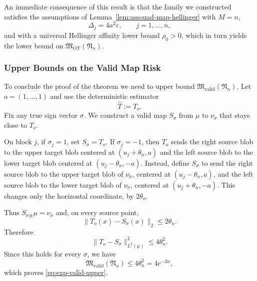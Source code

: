 \documentclass[11pt,twoside]{article}
\newcommand{\targetclass}{\mathfrak{N}}
\newcommand{\validminimaxrisk}{\mathfrak{M}_{\text{valid}}}
\newcommand{\otminimaxrisk}{\mathfrak{M}_{\text{OT}}}
\begin{document}
An immediate consequence of this result is that 
the family we constructed satisfies the assumptions of
Lemma~\ref{lem:assouad-map-hellinger} with $M=n$,
\[
\Delta_j=4a^2\varepsilon,
\qquad j=1,\ldots,n,
\]
and with a universal Hellinger affinity lower bound $\rho_0>0$, which in turn yields the lower bound on $\otminimaxrisk(\targetclass_n)$.

\subsubsection{Upper Bounds on the Valid Map Risk}
To conclude the proof of the theorem we need to upper bound $\validminimaxrisk(\targetclass_n)$.
Let $o = (1,\ldots,1)$ and use the deterministic estimator
\[
\widehat T:=T_o.
\]
Fix any true sign vector $\sigma$. We construct a valid map $S_\sigma$
from $\mu$ to $\nu_\sigma$ that stays close to $T_o$.

On block $j$, if $\sigma_j=1$, set $S_\sigma=T_o$. If
$\sigma_j=-1$, then $T_o$ sends the right source blob to the
upper target blob centered at $(u_j+\theta_n,a)$ and the left source blob
to the lower target blob centered at $(u_j-\theta_n,-a)$. Instead, define
$S_\sigma$ to send the right source blob to the upper target blob of
$\nu_\sigma$, centered at $(u_j-\theta_n,a)$, and the left source blob to
the lower target blob of $\nu_\sigma$, centered at
$(u_j+\theta_n,-a)$. This changes only the horizontal coordinate, by
$2\theta_n$.

Thus $S_{\sigma\#}\mu=\nu_\sigma$ and, on every source point,
\[
\|T_{o}(x)-S_\sigma(x)\|_2\leq 2\theta_n.
\]
Therefore
\[
\|T_{o}-S_\sigma\|_{L^2(\mu)}^2
\leq
4\theta_n^2.
\]
Since this holds for every $\sigma$, we have
\[
\validminimaxrisk(\targetclass_n)
\leq
4\theta_n^2
=
4e^{-2n},
\]
which proves \eqref{eq:exp-valid-upper}.
\end{document}
